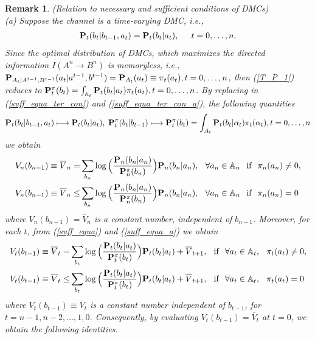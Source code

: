 \documentclass[11pt, a4paper, journal,onecolumn]{IEEEtran}
\newcommand{\mb}{\mathbb}
\newcommand{\rar}{\rightarrow}
\newcommand{\bea}{\begin{eqnarray}}
\newcommand{\eea}{\end{eqnarray}}
\newcommand{\hso}{\hspace{.1in}}
\newcommand{\hst}{\hspace{.2in}}
\newtheorem{remark}{Remark}[section]
\begin{document}
\begin{remark}(Relation to necessary and sufficient conditions of DMCs)\\
\label{rem_DMC}
(a) Suppose the channel is a time-varying DMC, i.e., 
\bea
{\bf P}_t(b_t|b_{t-1}, a_t)={\bf P}_t(b_t|a_t),\hst  t=0, \ldots, n. \label{remar_eq}
\eea
 Since the optimal distribution of DMCs, which maximizes  the directed information $I(A^n \rar B^n)$ is memoryless, i.e., ${\bf P}_{A_t|A^{t-1}, B^{t-1}}(a_t|a^{t-1},b^{t-1})={\bf P}_{A_t}(a_t)\equiv \pi_t(a_t), t=0, \ldots, n$, then  (\ref{T_P_1}) reduces to 
${\bf P}_t^\pi(b_t)=\int_{{\mb A}_t}{\bf P}_t(b_t|a_t)\pi_t(a_t), t=0, \ldots, n$. By replacing in (\ref{suff_equa_ter_con}) and (\ref{suff_equa_ter_con_a}), the following quantities 
\bea
{\bf P}_t(b_t|b_{t-1}, a_t) \longmapsto {\bf P}_t(b_t|a_t), \; {\bf P}_t^\pi(b_t|b_{t-1}) \longmapsto {\bf P}_t^\pi(b_t)=\int_{A_t}{\bf P}_t(b_t|\alpha_t)\pi_t(\alpha_t), t=0, \ldots, n
\eea 
we obtain
\begin{align}
 V_n(b_{n-1})\equiv \overline{V}_n =& \sum_{b_{n}}\log\Big(\frac{{\bf P}_n(b_n|a_n)}{{\bf P}^{\pi}_{n}(b_n)}\Big){\bf P}_n(b_n|a_n), \hso   \forall{a_n}\in{\mb A}_n \hso \mbox{if} \hso \pi_n(a_n)\neq{0},  \label{suff_equa_ter_con_c}\\
V_n(b_{n-1}) \equiv \overline{V}_n \leq & \sum_{b_{n}}\log\Big(\frac{{\bf P}_n(b_n|a_n)}{{\bf P}^{\pi}_{n}(b_n)}\Big){\bf P}_n(b_n|a_n), \hso   \forall{a_n}\in{\mb A}_n \hso \mbox{if} \hso \pi_n(a_n)={0}  \label{suff_equa_ter_con_d}
\end{align}
where  $V_n(b_{n-1})=\overline{V}_n$ is a constant number, independent of $b_{n-1}$.  Moreover, for each $t$, from (\ref{suff_equa}) and (\ref{suff_equa_a}) we obtain
\begin{align}
 V_t(b_{t-1})\equiv \overline{V}_t = & \sum_{b_{t}}\log\Big(\frac{{\bf P}_t(b_t|a_t)}{{\bf P}_t^{\pi}(b_t)}\Big){\bf P}_t(b_t|a_t) + \overline{V}_{t+1}, \hso \mbox{if} \hso \forall {a_t}\in{\mb A}_t, \hso \pi_t(a_t)\neq{0}, \label{suff_equa_e}\\
 V_t(b_{t-1})\equiv \overline{V}_t \leq & \sum_{b_{t}}\log\Big(\frac{{\bf P}_t(b_t|a_t)}{{\bf P}_t^{\pi}(b_t)}\Big){\bf P}_t(b_t|a_t)+ \overline{V}_{t+1}, \hso \mbox{if} \hso \forall {a_t}\in{\mb A}_t, \hso \pi_t(a_t)={0} \label{suff_equa_f}
\end{align}
where $ V_t(b_{t-1})\equiv \overline{V}_t $ is a constant number independent of $b_{t-1}$, for $t=n-1,n-2,\ldots,1,0$. Consequently, by evaluating $V_t(b_{t-1})=\overline{V}_{t}$ at $t=0$, we obtain the following identities. 

\end{remark}
\end{document}
